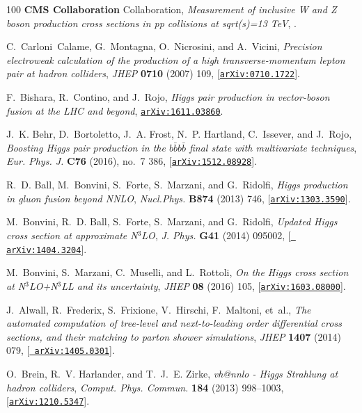\begin{thebibliography}{100}
{\bf CMS Collaboration} Collaboration, {\it {Measurement of inclusive W and Z
  boson production cross sections in pp collisions at sqrt(s)=13 TeV}}, .

C.~Carloni~Calame, G.~Montagna, O.~Nicrosini, and A.~Vicini, {\it {Precision
  electroweak calculation of the production of a high transverse-momentum
  lepton pair at hadron colliders}},  {\em JHEP} {\bf 0710} (2007) 109,
  [\href{http://arxiv.org/abs/0710.1722}{{\tt arXiv:0710.1722}}].

F.~Bishara, R.~Contino, and J.~Rojo, {\it {Higgs pair production in
  vector-boson fusion at the LHC and beyond}},
  \href{http://arxiv.org/abs/1611.03860}{{\tt arXiv:1611.03860}}.

J.~K. Behr, D.~Bortoletto, J.~A. Frost, N.~P. Hartland, C.~Issever, and
  J.~Rojo, {\it {Boosting Higgs pair production in the $b\bar{b}b\bar{b}$ final
  state with multivariate techniques}},  {\em Eur. Phys. J.} {\bf C76} (2016),
  no.~7 386, [\href{http://arxiv.org/abs/1512.08928}{{\tt arXiv:1512.08928}}].

R.~D. Ball, M.~Bonvini, S.~Forte, S.~Marzani, and G.~Ridolfi, {\it {Higgs
  production in gluon fusion beyond NNLO}},  {\em Nucl.Phys.} {\bf B874} (2013)
  746, [\href{http://arxiv.org/abs/1303.3590}{{\tt arXiv:1303.3590}}].

M.~Bonvini, R.~D. Ball, S.~Forte, S.~Marzani, and G.~Ridolfi, {\it {Updated
  Higgs cross section at approximate N$^3$LO}},  {\em J. Phys.} {\bf G41}
  (2014) 095002, [\href{http://arxiv.org/abs/1404.3204}{{\tt
  arXiv:1404.3204}}].

M.~Bonvini, S.~Marzani, C.~Muselli, and L.~Rottoli, {\it {On the Higgs cross
  section at N$^{3}$LO+N$^{3}$LL and its uncertainty}},  {\em JHEP} {\bf 08}
  (2016) 105, [\href{http://arxiv.org/abs/1603.08000}{{\tt arXiv:1603.08000}}].

J.~Alwall, R.~Frederix, S.~Frixione, V.~Hirschi, F.~Maltoni, et~al., {\it {The
  automated computation of tree-level and next-to-leading order differential
  cross sections, and their matching to parton shower simulations}},  {\em
  JHEP} {\bf 1407} (2014) 079, [\href{http://arxiv.org/abs/1405.0301}{{\tt
  arXiv:1405.0301}}].

O.~Brein, R.~V. Harlander, and T.~J.~E. Zirke, {\it {vh@nnlo - Higgs Strahlung
  at hadron colliders}},  {\em Comput. Phys. Commun.} {\bf 184} (2013)
  998--1003, [\href{http://arxiv.org/abs/1210.5347}{{\tt arXiv:1210.5347}}].


\end{thebibliography}

